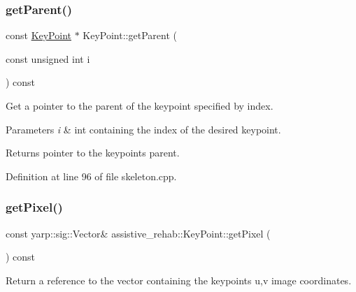 \subsubsection{\texorpdfstring{getParent()}{getParent()}}
{\footnotesize\ttfamily const \mbox{\hyperlink{classassistive__rehab_1_1KeyPoint}{Key\+Point}} $\ast$ Key\+Point\+::get\+Parent (\begin{DoxyParamCaption}\item[{const unsigned int}]{i }\end{DoxyParamCaption}) const}



Get a pointer to the parent of the keypoint specified by index. 


\begin{DoxyParams}{Parameters}
{\em i} & int containing the index of the desired keypoint. \\
\hline
\end{DoxyParams}
\begin{DoxyReturn}{Returns}
pointer to the keypoint\textquotesingle{}s parent. 
\end{DoxyReturn}


Definition at line 96 of file skeleton.\+cpp.


\begin{DoxyCode}{0}

\end{DoxyCode}
\mbox{\label{classassistive__rehab_1_1KeyPoint_afebdf9ab021c866f00a2e8a3f9fc4c11}} 
\subsubsection{\texorpdfstring{getPixel()}{getPixel()}}
{\footnotesize\ttfamily const yarp\+::sig\+::\+Vector\& assistive\+\_\+rehab\+::\+Key\+Point\+::get\+Pixel (\begin{DoxyParamCaption}{ }\end{DoxyParamCaption}) const\hspace{0.3cm}{\ttfamily [inline]}}



Return a reference to the vector containing the keypoint\textquotesingle{}s u,v image coordinates. 

